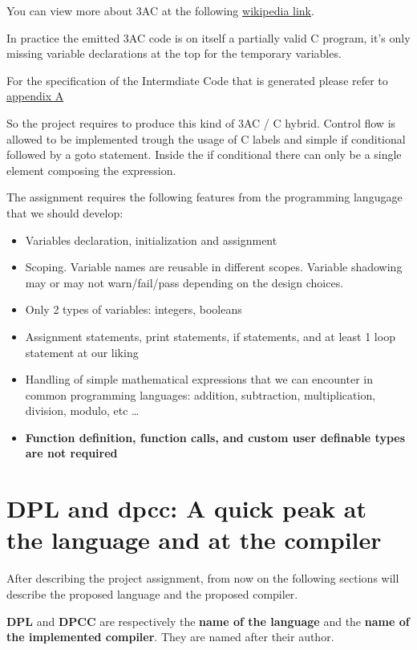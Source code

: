 \documentclass[a4paper]{article}
\begin{document}
You can view more about 3AC at the following \href{https://en.wikipedia.org/wiki/Three-address_code}{wikipedia link}.

In practice the emitted 3AC code is on itself a partially valid C program, it's only missing variable
declarations at the top for the temporary variables.


For the specification of the Intermdiate Code that is generated please refer to \hyperref[appendix_a]{appendix A}

So the project requires to produce this kind of 3AC / C hybrid. Control flow is allowed to be implemented
trough the usage of C labels and simple if conditional followed by a goto statement. Inside
the if conditional there can only be a single element composing the expression.

The assignment requires the following features from the programming langugage that we should develop:

\begin{itemize}
    \item Variables declaration, initialization and assignment
    \item Scoping. Variable names are reusable in different scopes. Variable
        shadowing may or may not warn/fail/pass depending on the design choices.
    \item Only 2 types of variables: integers, booleans
    \item Assignment statements, print statements, if statements, and at least 1 loop statement at our liking
    \item Handling of simple mathematical expressions that we can encounter in common programming
        languages: addition, subtraction, multiplication, division, modulo, etc \dots
    \item \textbf{Function definition, function calls, and custom user definable types are not required}
\end{itemize}

\clearpage

\section{DPL and dpcc: A quick peak at the language and at the compiler}

After describing the project assignment, from now on the following sections will describe the proposed language
and the proposed compiler.

\textbf{DPL} and \textbf{DPCC} are respectively the \textbf{name of the language} and the
\textbf{name of the implemented compiler}. They are named after their author.
\end{document}
